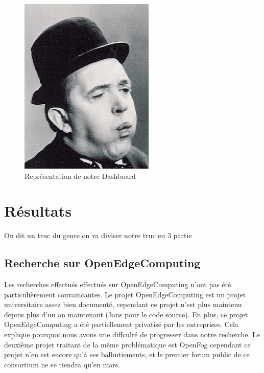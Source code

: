 \documentclass[twocolumn,a4paper]{IEEEtranfr}
\begin{document}
\begin{figure}[htpb]
  \begin{center}
    \includegraphics[width=0.7\columnwidth] {../images/SLaurel.jpg}
  \end{center}
  \caption{Représentation de notre Dashboard}
  \label{fig:gouts}
\end{figure}

\section{Résultats}

On dit un truc du genre on va diviser notre truc en 3 partie

\subsection{Recherche sur OpenEdgeComputing}

Les recherches effectués effectués sur OpenEdgeComputing n’ont pas été particulièrement convaincantes. Le projet OpenEdgeComputing est un projet universitaire assez bien documenté, cependant ce projet n’est plus maintenu depuis plus d’un an maintenant (3ans pour le code source). En plus, ce projet OpenEdgeComputing a été partiellement privatisé par les entreprises. Cela explique pourquoi nous avons une diffculté de progresser dans notre recherche. Le deuxième projet traitant de la même problématique est OpenFog cependant ce projet n’en est encore qu'à ses balbutiements, et le premier forum public de ce consortium ne se tiendra qu’en mars. 
\end{document}
